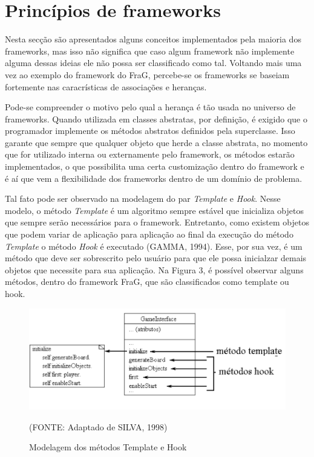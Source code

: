 \documentclass[
    12pt,       %
    openright,      %
    twoside,      %
    a4paper,      %
    english,      %
    french,       %
    spanish,      %
    brazil,       %
    ]{abntex2}
\begin{document}
      \section{Princípios de frameworks}
          Nesta secção são apresentados alguns conceitos implementados pela maioria
          dos frameworks, mas isso não significa que caso algum framework não implemente
          alguma dessas ideias ele não possa ser classificado como tal. Voltando mais uma
          vez ao exemplo do framework do FraG, percebe-se os frameworks se baseiam
          fortemente nas caracrísticas de associações e heranças.

          Pode-se compreender o motivo pelo qual a herança é tão usada no universo de
          frameworks. Quando utilizada em classes abstratas, por definição, é exigido que
          o programador implemente os métodos abstratos definidos pela superclasse. Isso
          garante que sempre que qualquer objeto que herde a classe abstrata, no momento
          que for utilizado interna ou externamente pelo framework, os métodos estarão
          implementados, o que possibilita uma certa customização dentro do framework e
          é aí que vem a flexibilidade dos frameworks dentro de um domínio de problema.

          Tal fato pode ser observado na modelagem do par \textit{Template} e
          \textit{Hook}. Nesse modelo, o método \textit{Template} é um algoritmo sempre
          estável que inicializa objetos que sempre serão necessários para o framework.
          Entretanto, como existem objetos que podem variar de aplicação para aplicação
          ao final da execução do método \textit{Template} o método \textit{Hook} é
          executado (GAMMA, 1994). Esse, por sua vez, é um método que deve ser sobrescrito pelo usuário
          para que ele possa inicialzar demais objetos que necessite para sua aplicação.
          Na Figura 3, é possível observar alguns métodos, dentro do framework FraG, que
          são classificados como template ou hook.

          \begin{figure}[htbp]
              \begin{center}
                  \includegraphics[width=1.0\textwidth]{img/templateHook.png}
              \end{center}
              \caption{\label{fig:passaro}Modelagem dos métodos Template e Hook}
              \begin{center}(FONTE: Adaptado de SILVA, 1998)\end{center}
          \end{figure}
\end{document}
